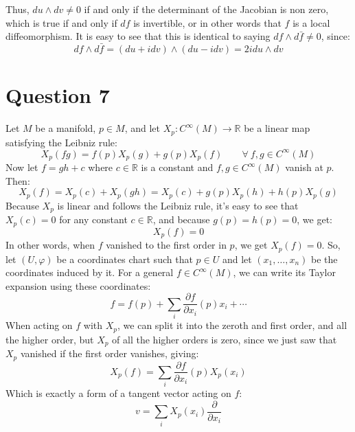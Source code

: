 \documentclass{article}
\newcommand{\R}{\ensuremath{\mathbb{R}}}
\begin{document}
Thus, $du \wedge dv \ne 0$ if and only if the determinant of the Jacobian is non zero, which is true if and only if $df$ is invertible, or in other words that $f$ is a local diffeomorphism.
\newline
It is easy to see that this is identical to saying $df \wedge d\bar{f} \ne 0$, since:
\begin{equation}
    df \wedge d\bar{f} = \left(du + idv\right)\wedge\left(du - idv\right) = 2i du \wedge dv
\end{equation}

\section*{Question 7}
Let $M$ be a manifold, $p \in M$, and let $X_p: C^\infty(M) \rightarrow \R$ be a linear map satisfying the Leibniz rule:
\begin{equation}
    X_p(fg) = f(p)X_p(g)+g(p)X_p(f) \qquad \forall \ f,g \in C^\infty(M)
\end{equation}
Now let $f = gh + c$ where $c \in \R$ is a constant and $f,g \in C^\infty(M)$ vanish at $p$. Then:
\begin{equation}
    X_p(f) = X_p(c) + X_p(gh) = X_p(c) + g(p)X_p(h)+h(p)X_p(g)
\end{equation}
Because $X_p$ is linear and follows the Leibniz rule, it's easy to see that $X_p(c) = 0$ for any constant $c \in \R$, and because $g(p) = h(p) = 0$, we get:
\begin{equation}
    X_p(f) = 0
\end{equation}
In other words, when $f$ vanished to the first order in $p$, we get $X_p(f) = 0$.
\newline
So, let $(U, \varphi)$ be a coordinates chart such that $p \in U$ and let $(x_1, \dots, x_n)$ be the coordinates induced by it. For a general $f \in C^\infty(M)$, we can write its Taylor expansion using these coordinates:
\begin{equation}
    f = f(p) + \sum_i \frac{\partial f}{\partial x_i}(p)x_i + \cdots
\end{equation}
When acting on $f$ with $X_p$, we can split it into the zeroth and first order, and all the higher order, but $X_p$ of all the higher orders is zero, since we just saw that $X_p$ vanished if the first order vanishes, giving:
\begin{equation}
    X_p(f) = \sum_i \frac{\partial f}{\partial x_i}(p)X_p(x_i)
\end{equation}
Which is exactly a form of a tangent vector acting on $f$:
\begin{equation}
    v = \sum_i X_p(x_i) \frac{\partial}{\partial x_i}
\end{equation}
\end{document}
